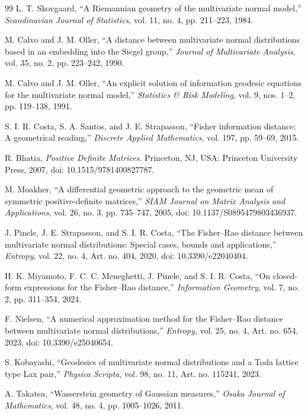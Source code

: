 \documentclass[11pt,a4paper]{article}
\theoremstyle{remark}
\begin{document}
\begin{thebibliography}{99}
L. T. Skovgaard, ``A Riemannian geometry of the multivariate normal model,'' \emph{Scandinavian Journal of Statistics}, vol. 11, no. 4, pp. 211--223, 1984.

M. Calvo and J. M. Oller, ``A distance between multivariate normal distributions based in an embedding into the Siegel group,'' \emph{Journal of Multivariate Analysis}, vol. 35, no. 2, pp. 223--242, 1990.

M. Calvo and J. M. Oller, ``An explicit solution of information geodesic equations for the multivariate normal model,'' \emph{Statistics \& Risk Modeling}, vol. 9, nos. 1--2, pp. 119--138, 1991.

S. I. R. Costa, S. A. Santos, and J. E. Strapasson, ``Fisher information distance: A geometrical reading,'' \emph{Discrete Applied Mathematics}, vol. 197, pp. 59--69, 2015.

R. Bhatia, \emph{Positive Definite Matrices}. Princeton, NJ, USA: Princeton University Press, 2007, doi: 10.1515/9781400827787.

M. Moakher, ``A differential geometric approach to the geometric mean of symmetric positive-definite matrices,'' \emph{SIAM Journal on Matrix Analysis and Applications}, vol. 26, no. 3, pp. 735--747, 2005, doi: 10.1137/S0895479803436937.

J. Pinele, J. E. Strapasson, and S. I. R. Costa, ``The Fisher--Rao distance between multivariate normal distributions: Special cases, bounds and applications,'' \emph{Entropy}, vol. 22, no. 4, Art. no. 404, 2020, doi: 10.3390/e22040404.

H. K. Miyamoto, F. C. C. Meneghetti, J. Pinele, and S. I. R. Costa, ``On closed-form expressions for the Fisher--Rao distance,'' \emph{Information Geometry}, vol. 7, no. 2, pp. 311--354, 2024.

F. Nielsen, ``A numerical approximation method for the Fisher--Rao distance between multivariate normal distributions,'' \emph{Entropy}, vol. 25, no. 4, Art. no. 654, 2023, doi: 10.3390/e25040654.

S. Kobayashi, ``Geodesics of multivariate normal distributions and a Toda lattice type Lax pair,'' \emph{Physica Scripta}, vol. 98, no. 11, Art. no. 115241, 2023.

A. Takatsu, ``Wasserstein geometry of Gaussian measures,'' \emph{Osaka Journal of Mathematics}, vol. 48, no. 4, pp. 1005--1026, 2011.


\end{thebibliography}
\end{document}
